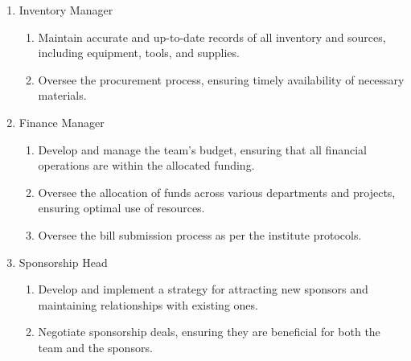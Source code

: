 \documentclass[12pt]{article}
\begin{document}
\begin{enumerate}
\begin{enumerate}
\begin{enumerate}
        \end{enumerate}
        \item Steering and Suspension (2)
        \begin{enumerate}
            \item Design, test and analyze steering and suspension components, ensuring they meet safety and performance standards as per rulebook.
            \item Ensure proper fabrication of steering and suspension components as per the design.
        \end{enumerate}
        \item Braking (1)
        \begin{enumerate}
            \item Design and enhance brake systems to ensure higher safety standards in brake functionality and compliance with the criteria mentioned in the rulebook.
        \end{enumerate}
    \end{enumerate}
    \item Inventory Manager
    \begin{enumerate}
        \item Maintain accurate and up-to-date records of all inventory and sources, including equipment, tools, and supplies.
        \item Oversee the procurement process, ensuring timely availability of necessary materials.
    \end{enumerate}
    \item Finance Manager
    \begin{enumerate}
        \item Develop and manage the team’s budget, ensuring that all financial operations are within the allocated funding.
        \item Oversee the allocation of funds across various departments and projects, ensuring optimal use of resources.
        \item Oversee the bill submission process as per the institute protocols.
    \end{enumerate}
    \item Sponsorship Head
    \begin{enumerate}
        \item Develop and implement a strategy for attracting new sponsors and maintaining relationships with existing ones.
        \item Negotiate sponsorship deals, ensuring they are beneficial for both the team and the sponsors.

\end{enumerate}
\end{enumerate}
\end{document}
